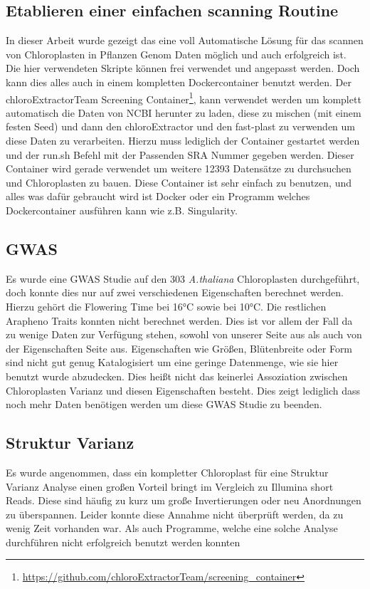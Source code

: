 \documentclass{scrartcl}
\begin{document}
\subsection{Etablieren einer einfachen scanning Routine}
\label{sec-5-5}
In dieser Arbeit wurde gezeigt das eine voll Automatische Lösung für das scannen von Chloroplasten in Pflanzen Genom Daten möglich und auch erfolgreich ist. Die hier verwendeten Skripte können frei verwendet und angepasst werden. 
Doch kann dies alles auch in einem kompletten Dockercontainer benutzt werden. Der chloroExtractorTeam Screening Container\footnote{\url{https://github.com/chloroExtractorTeam/screening_container}}, kann verwendet werden um komplett automatisch die Daten von NCBI herunter zu laden, diese zu mischen
(mit einem festen Seed) und dann den chloroExtractor und den fast-plast zu verwenden um diese Daten zu verarbeiten. Hierzu muss lediglich der Container gestartet werden und der run.sh Befehl mit der Passenden SRA Nummer gegeben 
werden. Dieser Container wird gerade verwendet um weitere 12393 Datensätze zu durchsuchen und Chloroplasten zu bauen. Diese Container ist sehr einfach zu benutzen, und alles was dafür gebraucht wird ist Docker\footnotemark[40]{} oder ein Programm
welches Dockercontainer ausführen kann wie z.B. Singularity\footnotemark[49]{}. 
\subsection{GWAS}
\label{sec-5-6}
Es wurde eine GWAS Studie auf den 303 \emph{A.thaliana} Chloroplasten durchgeführt, doch konnte dies nur auf zwei verschiedenen Eigenschaften berechnet werden. Hierzu gehört die Flowering Time bei 16°C sowie bei 10°C. 
Die restlichen Arapheno Traits konnten nicht berechnet werden. Dies ist vor allem der Fall da zu wenige Daten zur Verfügung stehen, sowohl von unserer Seite aus als auch von der Eigenschaften Seite aus. Eigenschaften wie
Größen, Blütenbreite oder Form sind nicht gut genug Katalogisiert um eine geringe Datenmenge, wie sie hier benutzt wurde abzudecken. Dies heißt nicht das keinerlei Assoziation zwischen Chloroplasten Varianz und diesen Eigenschaften besteht.
Dies zeigt lediglich dass noch mehr Daten benötigen werden um diese GWAS Studie zu beenden‌.
\subsection{Struktur Varianz}
\label{sec-5-7}
Es wurde angenommen, dass ein kompletter Chloroplast für eine Struktur Varianz Analyse einen großen Vorteil bringt im Vergleich zu Illumina short Reads. Diese sind häufig zu kurz um große Invertierungen oder neu Anordnungen zu 
überspannen. Leider konnte diese Annahme nicht überprüft werden, da zu wenig Zeit vorhanden war. Als auch Programme, welche eine solche Analyse durchführen nicht erfolgreich benutzt werden konnten 
\end{document}
